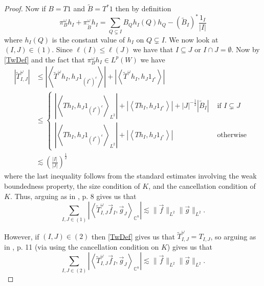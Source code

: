 \documentclass[12pt,reqno ]{amsart}
\numberwithin{equation}{section}
\theoremstyle{definition}
\newcommand{\C}{\ensuremath{\mathbb{C}^n}}
\newcommand{\V}[1]{\ensuremath{\vec{#1}}}
\newcommand{\ip}[2]{\ensuremath{\left\langle#1,#2\right\rangle}}
\newcommand{\W}[1]{\ensuremath{\widetilde{#1}}}
\begin{document}
\begin{proof}
Now if $B = T1$ and $\W{B} = T^*1$ then by definition \begin{equation} \label{TwDef} \pi_{B} ^\omega h_I +  \pi_{\W{B}}^\omega  h_I = \sum_{Q \subsetneq I} B_Q h_I (Q) h_Q - (\W{B} _I)^* \frac{1_I}{|I|} \end{equation} where $h_I(Q)$ is the constant value of $h_I$ on $Q \subsetneq I$.     We now look at $(I, J) \in (1)$. Since $\ell(I) \leq \ell(J)$ we have that $I \subseteq J$ or $I \cap J = \emptyset$.   Now by \eqref{TwDef} and the fact that $\pi_{B} ^\omega h_I \in L^p(W)$ we have  \begin{align*} |\W{T}^\omega _{I, J}| & \leq  |\ip{\W{T}^\omega h_I}{h_J 1_{(I^*)^c}}| + | \ip{\W{T}^\omega h_I}{h_J 1_{I^*}}| \\ & \leq \left\{
\begin{array}{ll}
      |\ip{{T} h_I}{h_J 1_{(I^*)^c}}_{L^2}| + |\ip{{T} h_I}{h_J 1_{I^*}}|  + |J|^{-\frac12} |\W{B}_I|   & \text{ if }I \subsetneq J \\
      |\ip{{T} h_I}{h_J 1_{(I^*)^c}}_{L^2}| + |\ip{{T} h_I}{h_J 1_{I^*}}| &  \text{ otherwise }
\end{array}
\right.
\\ & \lesssim \left(\frac{|I|}{|J|}\right)^\frac12
\end{align*} where the last inequality follows from the standard estimates involving the weak boundedness property, the size condition of $K$, and the cancellation condition of $K$.  Thus, arguing as in \cite{CT}, p. $8$ gives us that \begin{equation*} \sum_{I, J \in (1)} |\ip{\W{T}^\omega _{I, J}\V{f}_{I}}{\V{g}_J}_{\C} | \lesssim \|\V{f}\|_{L^2} \|\V{g}\|_{L^2}. \end{equation*}

However, if $(I, J) \in (2)$ then \eqref{TwDef} gives us that $\W{T}^\omega _{I, J} = T _{I, J}$, so arguing as in \cite{CT}, p. 11 (via using the cancellation condition on $K$) gives us that \begin{equation*} \sum_{I, J \in (2)} |\ip{\W{T}^\omega _{I, J}\V{f}_{I}}{\V{g}_J}_{\C} | \lesssim \|\V{f}\|_{L^2} \|\V{g}\|_{L^2}. \end{equation*}


\end{proof}
\end{document}
